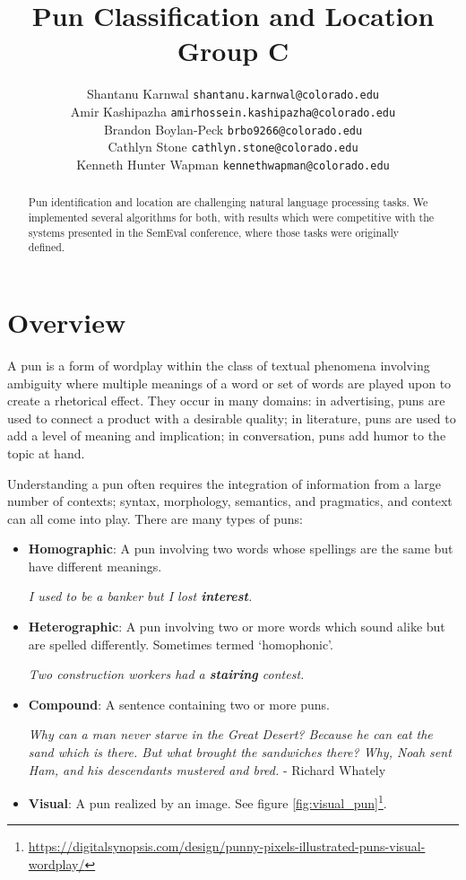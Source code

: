 \documentclass{article}
\title{Pun Classification and Location\\Group C}
\author{
   Shantanu Karnwal \texttt{shantanu.karnwal@colorado.edu} \\
   \And Amir Kashipazha \texttt{amirhossein.kashipazha@colorado.edu} \\
   \And Brandon Boylan-Peck \texttt{brbo9266@colorado.edu} \\
   \And Cathlyn Stone \texttt{cathlyn.stone@colorado.edu} \\
   \And Kenneth Hunter Wapman \texttt{kennethwapman@colorado.edu} \\
}
\begin{document}
\maketitle

\begin{abstract}
	Pun identification and location are challenging natural language processing 
	tasks. We implemented several algorithms for both, with results which 
	were competitive with the systems presented in the SemEval conference, where
	those tasks were originally defined.
\end{abstract}


\section{Overview}
A pun is a form of wordplay within the class of textual phenomena involving
ambiguity where multiple meanings of a word or set of words are played upon to
create a rhetorical effect. They occur in many domains: in advertising, puns
are used to connect a product with a desirable quality; in literature, puns are
used to add a level of meaning and implication; in conversation, puns add humor
to the topic at hand.

Understanding a pun often requires the integration of information from a large
number of contexts; syntax, morphology, semantics, and pragmatics, and context
can all come into play. There are many types of puns:

\begin{itemize}
	\item{\textbf{Homographic}: A pun involving two words whose spellings are
		the same but have different meanings.
		\begin{center}
		\emph{I used to be a banker but I lost \textbf{interest}.}
		\end{center}
	}
	\item{\textbf{Heterographic}: A pun involving two or more words which sound
		alike but are spelled differently. Sometimes termed `homophonic'.
		\begin{center}
		\emph{Two construction workers had a \textbf{stairing} contest.}
		\end{center}
	}
	\item{\textbf{Compound}: A sentence containing two or more puns.
		\begin{center}
		\emph{Why can a man never starve in the Great Desert? Because he can
		eat the sand which is there. But what brought the sandwiches there?
		Why, Noah sent Ham, and his descendants mustered and bred.} - Richard Whately
		\end{center}
	}
	\item{\textbf{Visual}: A pun realized by an image. See figure \ref{fig:visual_pun}\footnote{\url{https://digitalsynopsis.com/design/punny-pixels-illustrated-puns-visual-wordplay/}}.
	}
\end{itemize}
\end{document}
